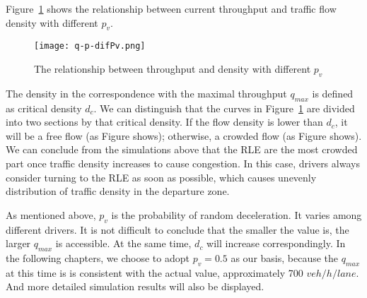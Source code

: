 \documentclass{mcmthesis}
\begin{document}
Figure~\ref{fig:q-p} shows the relationship between current throughput and
traffic flow density with different ${p}_{v}$.


\begin{figure}[h]
\small
\centering
\texttt{[image: q-p-difPv.png]}
\caption{The relationship between throughput and density with different ${p}_{v}$}
\label{fig:q-p}

\end{figure}

The density in the correspondence with the maximal throughput $q_{max}$ is
defined as critical density $d_{c}$. We can distinguish that the curves in
Figure~\ref{fig:q-p} are divided into two sections by that critical density.
If the flow density is lower than $d_{c}$, it will be a free flow (as Figure shows);%
 otherwise, a crowded flow (as Figure shows).%
We can conclude from the simulations above that the RLE are the most crowded
part once traffic density increases to cause congestion. In this case, drivers
always consider turning to the RLE as soon as possible, which causes unevenly
distribution of traffic density in the departure zone.


As mentioned above, ${p}_{v}$ is the probability of random deceleration.
It varies among different drivers. It is not difficult to conclude
that the smaller the value is, the larger $q_{max}$ is accessible. At the same
time, $d_{c}$ will increase correspondingly. In the following chapters, we
choose to adopt ${p}_{v}=0.5$ as our basis, because the $q_{max}$ at this time is
is consistent with the actual value, approximately 700 $veh/h/lane$. And more
detailed simulation results will also be displayed.
\end{document}
